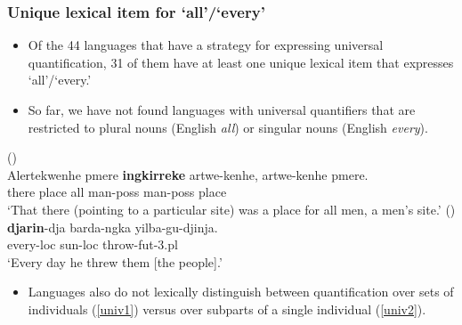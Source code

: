 \documentclass{article}
\begin{document}
\subsubsection{Unique lexical item for `all'/`every'}

\begin{itemize}
    \item  Of the 44 languages that have a strategy for expressing universal quantification, 31 of them have at least one unique lexical item that expresses `all'/`every.'
     \item So far, we have not found languages  with universal quantifiers that are restricted to plural nouns (English {\it all}) or singular nouns (English {\it every}).
\end{itemize}

\begin{exe}
 (\citealt[132]{wilkins89})\\
\gll Alertekwenhe pmere \textbf{ingkirreke} artwe-kenhe, artwe-kenhe pmere.\\
there place all man-{\sc poss} man-{\sc poss} place\\
\glt `That there (pointing to a particular site)
was a place for all men, a men's site.'
 (\citealt[48]{sands89}) \\
\gll \textbf{djarin}-dja barda-ngka yilba-gu-djinja.\\
    every-{\sc loc} sun-{\sc loc}   throw-{\sc fut}-3.{\sc pl}\\
\glt    `Every day he threw them [the people].'
\end{exe}

\begin{itemize}
    \item Languages also do not lexically distinguish between quantification over sets of individuals (\ref{univ1}) versus over subparts of a single individual (\ref{univ2}).
\end{itemize}
\end{document}
